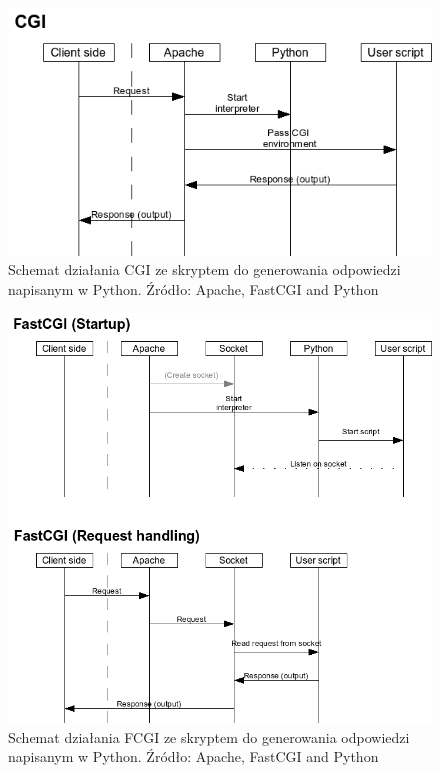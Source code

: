 \documentclass{report}
\begin{document}
			\begin{center}
				\begin{figure}[ht]
					\centering
					\includegraphics[scale=0.7]{flow_cgi.png}
					\caption{Schemat działania CGI ze skryptem do generowania odpowiedzi napisanym w Python. Źródło: Apache, FastCGI and Python}
				\end{figure}
			\end{center}
		
			\begin{center}
				\begin{figure}[ht]
					\centering
					\includegraphics[scale=0.7]{flow_fastcgi.png}
					\caption{Schemat działania FCGI ze skryptem do generowania odpowiedzi napisanym w Python. Źródło: Apache, FastCGI and Python}
				\end{figure}
			\end{center}
		
\end{document}
